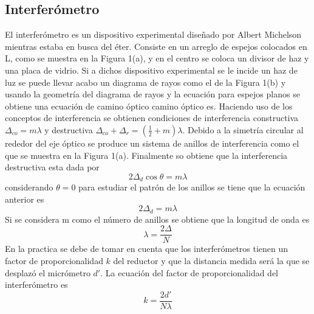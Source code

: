 \documentclass[DIV=calc, paper=a4, fontsize=10.5pt]{scrartcl}
\begin{document}
\subsection*{\textcolor{carmine}{Interferómetro}}
El interferómetro es un dispositivo experimental diseñado por Albert Michelson mientras estaba en busca del éter. Consiste en un arreglo de espejos colocados en L, como se muestra en la Figura 1(a), y en el centro se coloca un divisor de haz  y una placa de vidrio\cite{book}. Si a dichos dispositivo experimental se le incide un haz de luz se puede llevar acabo un diagrama de rayos como el de la Figura 1(b) y usando la geometría del diagrama de rayos y la ecuación para espejos planos se obtiene una ecuación de camino óptico camino óptico es\cite{Manual}.
Haciendo uso de los conceptos de interferencia se obtienen condiciones de interferencia constructiva $\Delta_{co}=m\lambda$ y destructiva $\Delta_{co}+\Delta_{r}=\left(\frac{1}{2}+m\right)\lambda$. Debido a la simetría circular al rededor del eje óptico se produce un sistema de anillos de interferencia como el que se muestra en la Figura 1(a). Finalmente so obtiene que la interferencia destructiva esta dada por\cite{book}
\begin{equation*}
    2\Delta_{d}\cos{\theta}=m\lambda
\end{equation*}
considerando $\theta=0$ para estudiar el patrón de los anillos se tiene que la ecuación anterior es 
\begin{equation*}
    2\Delta_{d}=m\lambda
\end{equation*}
Si se considera m como el número de anillos se obtiene que la longitud de onda es 
\begin{equation*}
    \lambda=\frac{2\Delta}{N}
\end{equation*}
En la practica se debe de tomar en cuenta que los interferómetros tienen un factor de proporcionalidad $k$ del reductor y que la distancia medida será la que se desplazó el micrómetro $d'$. La ecuación del factor de proporcionalidad del interferómetro es\cite{Manual}
\begin{equation}
    k=\frac{2d'}{N\lambda}
\end{equation}
\end{document}
